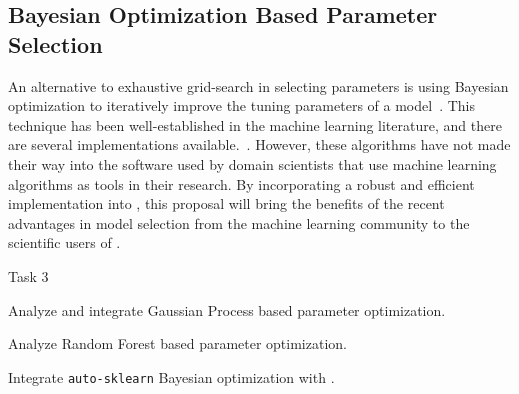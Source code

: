 \subsection{Bayesian Optimization Based Parameter Selection}
An alternative to exhaustive grid-search in selecting parameters is using
Bayesian optimization to iteratively improve the tuning parameters of a
model~\autocite{NIPS2011_4443, shahriari2016taking, NIPS2012_4522}.  This
technique has been well-established in the machine learning literature, and
there are several implementations available.~\autocite{bergstra2013hyperopt,
feurer-nips2015, komer2014hyperopt, snoek2015scalable}.  However, these
algorithms have not made their way into the software used by domain scientists
that use machine learning algorithms as tools in their research.
By incorporating a robust and efficient implementation into \sklearn{},
this proposal will bring the benefits of the recent advantages in model selection
from the machine learning community to the scientific users of \sklearn{}.
\begin{labeling}{Task 3}
    \itemsep-4pt
    \item [Task 3] Analyze and integrate Gaussian Process based parameter optimization.
    \item [Task 4] Analyze Random Forest based parameter optimization.
    \item [Task 5] Integrate \texttt{auto-sklearn} Bayesian optimization with \sklearn{}.
\end{labeling}

